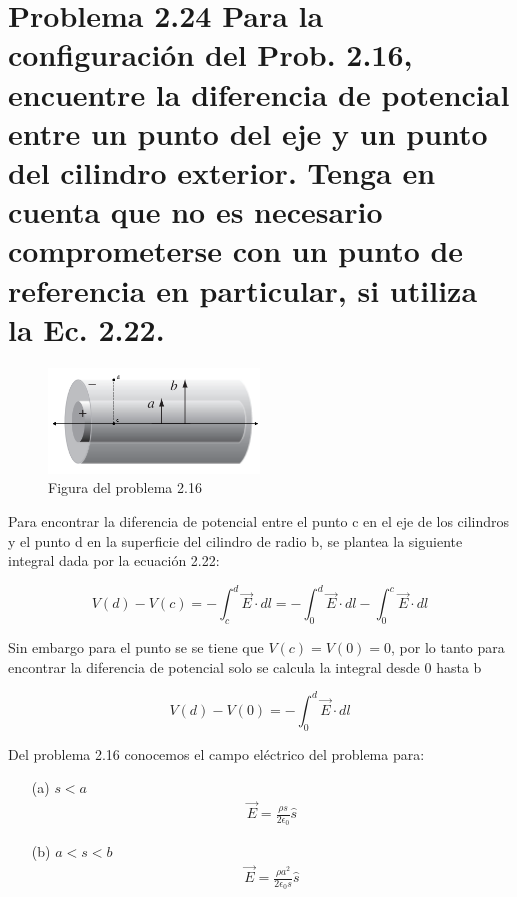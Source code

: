 \documentclass{article}
\newcommand{\problema}[2]{%
  \vspace{0.5cm}
  {\noindent\textbf{Problema #1} #2} 
  \noindent 
}
\begin{document}
\section*{\problema{2.24}{Para la configuración del Prob. 2.16, encuentre la diferencia de potencial entre un punto del eje y un punto del cilindro exterior. Tenga en cuenta que no es necesario comprometerse con un punto de referencia en particular, si utiliza la Ec. 2.22.}}

\begin{figure}[h]
  \centering
  \includegraphics[width=0.5\textwidth]{imagenes/Figure_2.26.png}
  \caption{\label{fig:problema_24}Figura del problema 2.16}
\end{figure}

Para encontrar la diferencia de potencial entre el punto c en el eje de los cilindros y el punto d en la superficie del cilindro de radio b, se plantea la siguiente integral dada por la ecuación 2.22:

\[
  V(d)-V(c) = -\int_{c}^{d} \vec{E} \cdot dl = -\int_{0}^{d} \vec{E} \cdot dl - \int_{0}^{c} \vec{E} \cdot dl
\]

Sin embargo para el punto se se tiene que $V(c)=V(0)=0$, por lo tanto para encontrar la diferencia de potencial solo se calcula la integral desde 0 hasta b

\[ V(d)-V(0) = -\int_{0}^{d} \vec{E} \cdot dl \]

Del problema 2.16 conocemos el campo eléctrico del problema para:
\begin{itemize}
  \item [(a)] $s<a$\
  \begin{align*}
    \vec{E} =\frac{\rho s}{2\epsilon_{0}}\hat{s}
  \end{align*}
  \item [(b)] $a<s<b$
  \begin{align*}
    \vec{E} =\frac{\rho a^2}{2\epsilon_{0} s}\hat{s}
  \end{align*}
\end{itemize}
\end{document}
